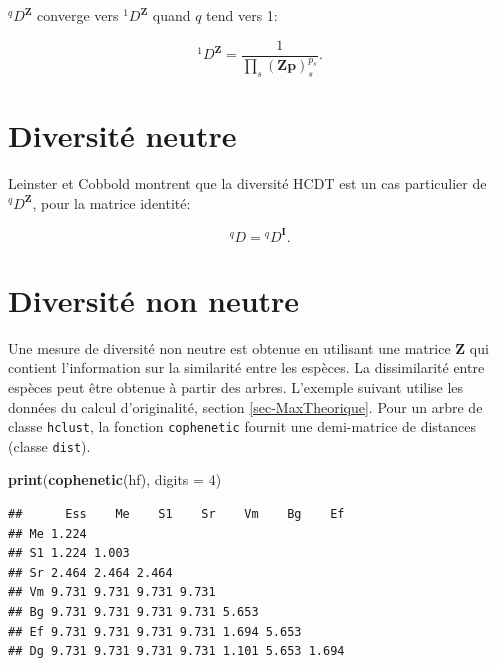 \documentclass[
  11pt,
  french,
  a4paper,
  extrafontsizes,onecolumn,openright
  ]{memoir}
\newenvironment{Shaded}{\begin{snugshade}}{\end{snugshade}}
\newcommand{\DataTypeTok}[1]{\textcolor[rgb]{0.13,0.29,0.53}{#1}}
\newcommand{\DecValTok}[1]{\textcolor[rgb]{0.00,0.00,0.81}{#1}}
\newcommand{\KeywordTok}[1]{\textcolor[rgb]{0.13,0.29,0.53}{\textbf{#1}}}
\newcommand{\NormalTok}[1]{#1}
\begin{document}
\(^q\!D^{\mathbf{Z}}\) converge vers \(^1\!D^{\mathbf{Z}}\) quand \(q\) tend vers 1:

\begin{equation}
  \label{eq:D1z}
  ^1\!D^{\mathbf{Z}} = \frac{1}{\prod_s{{\left(\mathbf{Zp}\right)}^{p_s}_s}}.
\end{equation}

\hypertarget{diversituxe9-neutre}{%
\section{Diversité neutre}\label{diversituxe9-neutre}}

Leinster et Cobbold montrent que la diversité HCDT est un cas particulier de \(^q\!D^{\mathbf{Z}}\), pour la matrice identité:

\begin{equation}
  \label{eq:DqI}
  ^{q}\!D={^q\!D^{\mathbf{I}}}.
\end{equation}

\hypertarget{diversituxe9-non-neutre}{%
\section{Diversité non neutre}\label{diversituxe9-non-neutre}}

Une mesure de diversité non neutre est obtenue en utilisant une matrice \(\mathbf{Z}\) qui contient l'information sur la similarité entre les espèces.
La dissimilarité entre espèces peut être obtenue à partir des arbres.
L'exemple suivant utilise les données du calcul d'originalité, section \ref{sec-MaxTheorique}.
Pour un arbre de classe \texttt{hclust}, la fonction \texttt{cophenetic} fournit une demi-matrice de distances (classe \texttt{dist}).

\scriptsize

\begin{Shaded}
\begin{Highlighting}[]
\KeywordTok{print}\NormalTok{(}\KeywordTok{cophenetic}\NormalTok{(hf), }\DataTypeTok{digits =} \DecValTok{4}\NormalTok{)}
\end{Highlighting}
\end{Shaded}

\begin{verbatim}
##      Ess    Me    S1    Sr    Vm    Bg    Ef
## Me 1.224                                    
## S1 1.224 1.003                              
## Sr 2.464 2.464 2.464                        
## Vm 9.731 9.731 9.731 9.731                  
## Bg 9.731 9.731 9.731 9.731 5.653            
## Ef 9.731 9.731 9.731 9.731 1.694 5.653      
## Dg 9.731 9.731 9.731 9.731 1.101 5.653 1.694
\end{verbatim}
\end{document}
